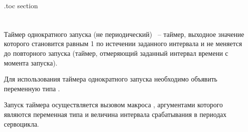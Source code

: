 \etocsettocdepth.toc {section}



\begin{comment}
\lstset{%
basicstyle=\small, %
keywordstyle=\color{black}\bfseries\underbar,
identifierstyle=, %
commentstyle=\color{white}, %
stringstyle=\ttfamily, %
showstringspaces=false} %
\end{comment}


\chapter{}
\label{sec:PLCs}


\section{}

\subsection{}

Таймер однократного запуска (не периодический) ~-- таймер, выходное значение которого становится равным 1 по истечении заданного интервала и не меняется до повторного запуска (таймер, отмеряющий заданный интервал времени с момента запуска). \killoverfullbefore

Для использования таймера однократного запуска необходимо объявить переменную типа . 

Запуск таймера осуществляется вызовом макроса , аргументами которого являются переменная типа  и величина интервала срабатывания в периодах сервоцикла.


